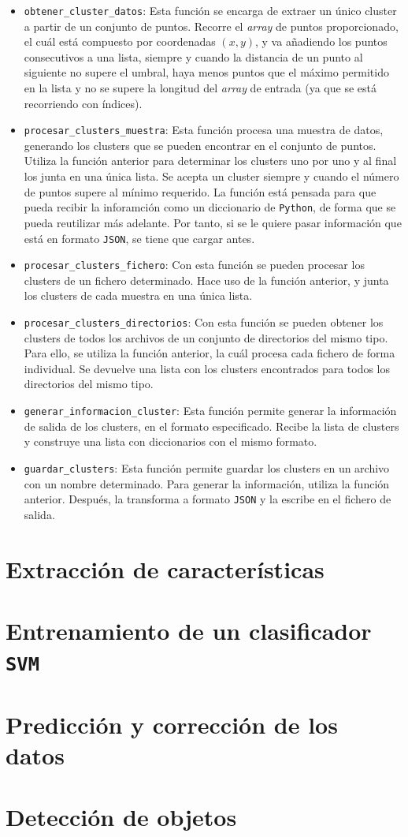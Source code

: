\documentclass[11pt,a4paper]{article}
\begin{document}
\begin{itemize}[label=\textbullet]
	\item \texttt{obtener\_cluster\_datos}: Esta función se encarga de extraer un único
	cluster a partir de un conjunto de puntos. Recorre el \textit{array} de puntos
	proporcionado, el cuál está compuesto por coordenadas $(x, y)$, y va añadiendo
	los puntos consecutivos a una lista, siempre y cuando la distancia de un punto
	al siguiente no supere el umbral, haya menos puntos que el máximo permitido en la
	lista y no se supere la longitud del \textit{array} de entrada (ya que se está
	recorriendo con índices).
	\item \texttt{procesar\_clusters\_muestra}: Esta función procesa una muestra de datos,
	generando los clusters que se pueden encontrar en el conjunto de puntos. Utiliza la
	función anterior para determinar los clusters uno por uno y al final los
	junta en una única lista. Se acepta un cluster siempre y cuando el número de puntos
	supere al mínimo requerido. La función está pensada para que pueda recibir la inforamción
	como un diccionario de \texttt{Python}, de forma que se pueda reutilizar más adelante.
	Por tanto, si se le quiere pasar información que está en formato \texttt{JSON}, se tiene
	que cargar antes.
	\item \texttt{procesar\_clusters\_fichero}: Con esta función se pueden procesar
	los clusters de un fichero determinado. Hace uso de la función anterior, y junta
	los clusters de cada muestra en una única lista.
	\item \texttt{procesar\_clusters\_directorios}: Con esta función se pueden obtener
	los clusters de todos los archivos de un conjunto de directorios del mismo tipo.
	Para ello, se utiliza la función anterior, la cuál procesa cada fichero de forma
	individual. Se devuelve una lista con los clusters encontrados para todos los
	directorios del mismo tipo.
	\item \texttt{generar\_informacion\_cluster}: Esta función permite generar la información
	de salida de los clusters, en el formato especificado. Recibe la lista de clusters y construye
	una lista con diccionarios con el mismo formato.
	\item \texttt{guardar\_clusters}: Esta función permite guardar los clusters en un
	archivo con un nombre determinado. Para generar la información, utiliza la función
	anterior. Después, la transforma a formato \texttt{JSON} y la escribe en el fichero
	de salida.
\end{itemize}

\section{Extracción de características}

\section{Entrenamiento de un clasificador \texttt{SVM}}

\section{Predicción y corrección de los datos}

\section{Detección de objetos}
\end{document}
